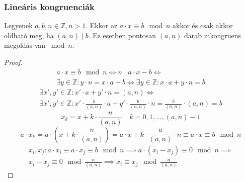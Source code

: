 \subsubsection{Lineáris kongruenciák}
\begin{theorem}
	Legyenek $a, b, n \in \mathbb{Z}, n > 1$.
	Ekkor az $a \cdot x \equiv b \mod n$ akkor és csak akkor oldható meg,
	ha $(a, n) \mid b$.
	Ez esetben pontosan $(a, n)$ darab inkongruens megoldás van $\bmod n$.
\end{theorem}
\begin{proof}
	\begin{multline*}
		a \cdot x \equiv b \mod n \iff
		n \mid a \cdot x - b \iff \\
		\exists y \in \mathbb{Z}: y \cdot n = x \cdot a - b \iff
		\exists y \in \mathbb{Z}: x \cdot a + y \cdot n = b
	\end{multline*}
	\begin{multline*}
		\exists x', y' \in \mathbb{Z}:
		x' \cdot a + y' \cdot n = (a, n) \iff \\
		\exists x', y' \in \mathbb{Z}:
		x' \cdot \frac{b}{(a, n)} \cdot a + y' \cdot \frac{b}{(a, n)} \cdot n =
		\frac{b}{(a, n)} \cdot (a, n) = b
	\end{multline*}
	\begin{equation*}
		x_k = x + k \cdot \frac{n}{(a, n)} \quad k = 0, 1, \dots, (a, n ) - 1
	\end{equation*}
	\begin{equation*}
		a \cdot x_k = a \cdot \left( x + k \cdot \frac{n}{(a, n)} \right) =
		a \cdot x + k \cdot \frac{a}{(a, n)} \cdot n \equiv
		a \cdot x \equiv b \mod n
	\end{equation*}
	\begin{multline*}
		x_i, x_j: a \cdot x_i \equiv a \cdot x_j \equiv b \mod n \implies
		a \cdot (x_i - x_j) \equiv 0 \mod n \implies \\
		x_i - x_j \equiv 0 \mod \frac{n}{(a, n)} \implies
		x_i \equiv x_j \mod \frac{n}{(a, n)}
	\end{multline*}
\end{proof}
